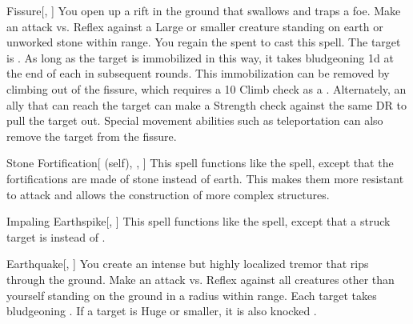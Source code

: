 \lowercase{\hypertarget{spell:Fissure}{}}\label{spell:Fissure}
\begin{apability}[\nth{3}]{\hypertarget{spell:Fissure}{Fissure}}[, ]
You open up a rift in the ground that swallows and traps a foe.
Make an attack vs. Reflex against a Large or smaller creature standing on earth or unworked stone within \rngmed range.
\miss You regain the  spent to cast this spell.
\hit The target is .
As long as the target is immobilized in this way,
it takes bludgeoning  \minus1d at the end of each  in subsequent rounds.
This immobilization can be removed by climbing out of the fissure, which requires a  10 Climb check as a .
Alternately, an ally that can reach the target can make a Strength check against the same DR to pull the target out.
Special movement abilities such as teleportation can also remove the target from the fissure.
\end{apability}
\vspace{0.25em}



\lowercase{\hypertarget{spell:Stone Fortification}{}}\label{spell:Stone Fortification}
\begin{attuneability}[\nth{3}]{\hypertarget{spell:Stone Fortification}{Stone Fortification}}[ (self), , ]
This spell functions like the  spell, except that the fortifications are made of stone instead of earth.
This makes them more resistant to attack and allows the construction of more complex structures.
\end{attuneability}
\vspace{0.25em}



\lowercase{\hypertarget{spell:Impaling Earthspike}{}}\label{spell:Impaling Earthspike}
\begin{apability}[\nth{4}]{\hypertarget{spell:Impaling Earthspike}{Impaling Earthspike}}[, ]
This spell functions like the  spell, except that a struck target is  instead of .
\end{apability}
\vspace{0.25em}



\lowercase{\hypertarget{spell:Earthquake}{}}\label{spell:Earthquake}
\begin{apability}[\nth{5}]{\hypertarget{spell:Earthquake}{Earthquake}}[, ]
You create an intense but highly localized tremor that rips through the ground.
Make an attack vs. Reflex against all creatures other than yourself standing on the ground in a \arealarge radius within \rnglong range.
\hit Each target takes bludgeoning .
If a target is Huge or smaller, it is also knocked .
\end{apability}
\vspace{0.25em}



